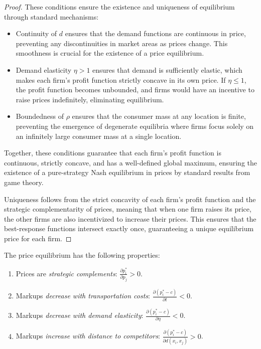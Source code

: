 \begin{proof}
These conditions ensure the existence and uniqueness of equilibrium through standard mechanisms:
\begin{itemize}
    \item Continuity of \( d \) ensures that the demand functions are continuous in price, preventing any discontinuities in market areas as prices change. This smoothness is crucial for the existence of a price equilibrium.
    \item Demand elasticity \( \eta > 1 \) ensures that demand is sufficiently elastic, which makes each firm's profit function strictly concave in its own price. If \( \eta \leq 1 \), the profit function becomes unbounded, and firms would have an incentive to raise prices indefinitely, eliminating equilibrium.
    \item Boundedness of \( \rho \) ensures that the consumer mass at any location is finite, preventing the emergence of degenerate equilibria where firms focus solely on an infinitely large consumer mass at a single location.
\end{itemize}

Together, these conditions guarantee that each firm's profit function is continuous, strictly concave, and has a well-defined global maximum, ensuring the existence of a pure-strategy Nash equilibrium in prices by standard results from game theory.

Uniqueness follows from the strict concavity of each firm's profit function and the strategic complementarity of prices, meaning that when one firm raises its price, the other firms are also incentivized to increase their prices. This ensures that the best-response functions intersect exactly once, guaranteeing a unique equilibrium price for each firm.
\end{proof}

\begin{proposition}  
The price equilibrium has the following properties:
\begin{enumerate}
    \item Prices are \textit{strategic complements}: \( \frac{\partial p^*_i}{\partial p_j} > 0 \).
    \item Markups \textit{decrease with transportation costs}: \( \frac{\partial (p^*_i - c)}{\partial t} < 0 \).
    \item Markups \textit{decrease with demand elasticity}: \( \frac{\partial (p^*_i - c)}{\partial \eta} < 0 \).
    \item Markups \textit{increase with distance to competitors}: \( \frac{\partial (p^*_i - c)}{\partial d(x_i, x_j)} > 0 \).
\end{enumerate}
\end{proposition}

